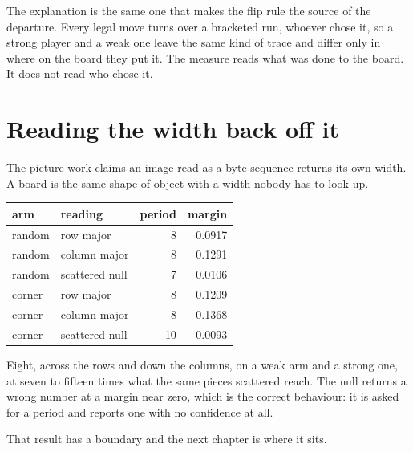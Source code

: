 The explanation is the same one that makes the flip rule the source of the departure. Every legal
move turns over a bracketed run, whoever chose it, so a strong player and a weak one leave the same
kind of trace and differ only in where on the board they put it. The measure reads what was done to
the board. It does not read who chose it.

\section{Reading the width back off it}

The picture work claims an image read as a byte sequence returns its own width. A board is the same
shape of object with a width nobody has to look up.

\begin{center}
\begin{tabular}{@{}llrr@{}}
\toprule
arm & reading & period & margin \\
\midrule
random & row major & 8 & 0.0917 \\
random & column major & 8 & 0.1291 \\
random & scattered null & 7 & 0.0106 \\
corner & row major & 8 & 0.1209 \\
corner & column major & 8 & 0.1368 \\
corner & scattered null & 10 & 0.0093 \\
\bottomrule
\end{tabular}
\end{center}

Eight, across the rows and down the columns, on a weak arm and a strong one, at seven to fifteen
times what the same pieces scattered reach. The null returns a wrong number at a margin near zero,
which is the correct behaviour: it is asked for a period and reports one with no confidence at all.

That result has a boundary and the next chapter is where it sits.

